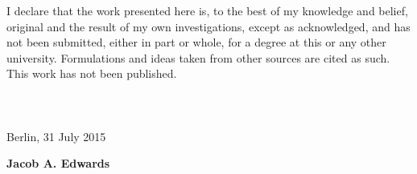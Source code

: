 \documentclass[%
   a4paper,%
  11pt,                    %
  openright,              %
  headsepline,          %
  cleardoubleempty,
  chapterprefix,
  titlepage,%
  liststotoc,%
  bibtotoc,%
  idxtotoc,%
  headinclude,           %
  pointlessnumbers,%
  USenglish
  ]{scrbook}
\theoremstyle{break}
\begin{document}
I declare that the work presented here is, to the best of my knowledge and belief, original and the result of my own investigations, except as acknowledged, and has not been submitted, either in part or whole, for a degree at this or any other university.
\linebreak
\linebreak
Formulations and ideas taken from other sources are cited as such. This work has not been published.\\
\\
\\
\\


Berlin, 31 July 2015

\hspace*{\fill}\textbf{Jacob A. Edwards}


\end{document}
